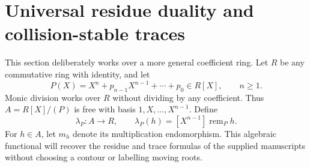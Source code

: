 \documentclass[11pt,letterpaper]{article}
\numberwithin{equation}{section}
\theoremstyle{definition}
\theoremstyle{remark}
\newcommand{\remp}{\operatorname{rem}}
\begin{document}
\section{Universal residue duality and collision-stable traces}\label{sec:residue}
This section deliberately works over a more general coefficient ring.
Let $R$ be any commutative ring with identity, and let
\[
 P(X)=X^n+p_{n-1}X^{n-1}+\cdots+p_0\in R[X],\qquad n\ge1.
\]
Monic division works over $R$ without dividing by any coefficient.
Thus $A=R[X]/(P)$ is free with basis $1,X,\ldots,X^{n-1}$.
Define
\begin{equation}\label{eq:lambdadef}
 \lambda_P:A\longrightarrow R,\qquad
 \lambda_P(h)=[X^{n-1}]\remp_P h.
\end{equation}
For $h\in A$, let $m_h$ denote its multiplication endomorphism. This
algebraic functional will recover the residue and trace formulas of the
supplied manuscripts without choosing a contour or labelling moving roots.
\end{document}
